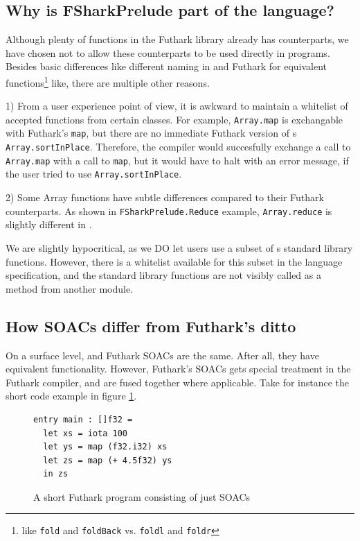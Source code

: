 \subsection*{Why is FSharkPrelude part of the \fshark{} language?}
Although plenty of functions in the Futhark library already has \fsharp{}
counterparts, we have chosen not to allow these \fsharp{} counterparts to be
used directly in \fshark{} programs.
Besides basic differences like different naming in \fsharp{} and Futhark for
equivalent functions\footnote{like \texttt{fold} and \texttt{foldBack} vs.
  \texttt{foldl} and \texttt{foldr}} like, there are multiple other reasons.

1) From a user experience point of view, it is awkward to maintain a whitelist
of accepted functions from certain classes.
For example, \texttt{Array.map} is exchangable with Futhark's
\texttt{map}, but there are no immediate Futhark version of \fsharp{}s
\texttt{Array.sortInPlace}. Therefore, the \fshark{} compiler would succesfully
exchange a call to \texttt{Array.map} with a call to \texttt{map}, but it would
have to halt with an error message, if the user tried to use \texttt{Array.sortInPlace}.

2) Some Array functions have subtle differences compared to their
Futhark counterparts. As shown in \texttt{FSharkPrelude.Reduce} example,
\texttt{Array.reduce} is slightly different in \fsharp{}.

We are slightly hypocritical, as we DO let users use a subset of \fsharp{}s
standard library functions. However, there is a whitelist available for this
subset in the \fshark{} language specification, and the standard library
functions are not visibly called as a method from another module.

\subsection*{How \fshark{} SOACs differ from Futhark's ditto}
On a surface level, \fshark{} and Futhark SOACs are the same. After all, they
have equivalent functionality.
However, Futhark's SOACs gets special treatment in the Futhark compiler, and are
fused together where applicable.
Take for instance the short code example in figure \ref{fig:futharkfusion}.

\begin{figure}[h]
  \centering
\begin{lstlisting}[language=Futhark]
entry main : []f32 =
  let xs = iota 100
  let ys = map (f32.i32) xs
  let zs = map (+ 4.5f32) ys
  in zs
\end{lstlisting}
  \caption{A short Futhark program consisting of just SOACs}
  \label{fig:futharkfusion}
\end{figure}


